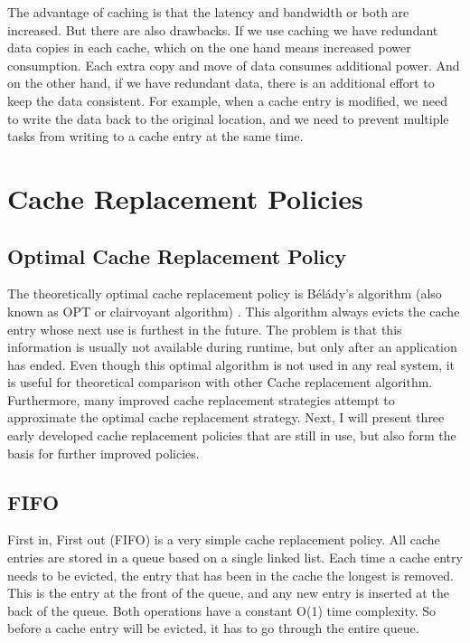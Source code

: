 \documentclass[
	12pt,
	a4paper,
	abstract,
	bibliography=totoc,
	chapterprefix,
	headings=openright,
	numbers=endperiod,
	parskip=half,
	twoside,
]{scrreprt}
\begin{document}
The advantage of caching is that the latency and bandwidth or both are increased.
But there are also drawbacks.
If we use caching we have redundant data copies in each cache, which on the one hand means increased power consumption.
Each extra copy and move of data consumes additional power.
And on the other hand, if we have redundant data, there is an additional effort to keep the data consistent.
For example, when a cache entry is modified, we need to write the data back to the original location, and we need to prevent multiple tasks from writing to a cache entry at the same time.


\section{Cache Replacement Policies}
\subsection{Optimal Cache Replacement Policy}
The theoretically optimal cache replacement policy is Bélády's algorithm (also known as OPT or clairvoyant algorithm) \cite{belady1966study}.
This algorithm always evicts the cache entry whose next use is furthest in the future.
The problem is that this information is usually not available during runtime, but only after an application has ended.
Even though this optimal algorithm is not used in any real system, it is useful for theoretical comparison with other 
Cache replacement algorithm.
Furthermore, many improved cache replacement strategies attempt to approximate the optimal cache replacement strategy.
Next, I will present three early developed cache replacement policies that are still in use, but also form the basis for further improved policies.


\subsection{FIFO}

First in, First out (FIFO) is a very simple cache replacement policy.
All cache entries are stored in a queue based on a single linked list.
Each time a cache entry needs to be evicted, the entry that has been in the cache the longest is removed.
This is the entry at the front of the queue, and any new entry is inserted at the back of the queue. Both operations have a constant O(1) time complexity.
So before a cache entry will be evicted, it has to go through the entire queue.
\end{document}
